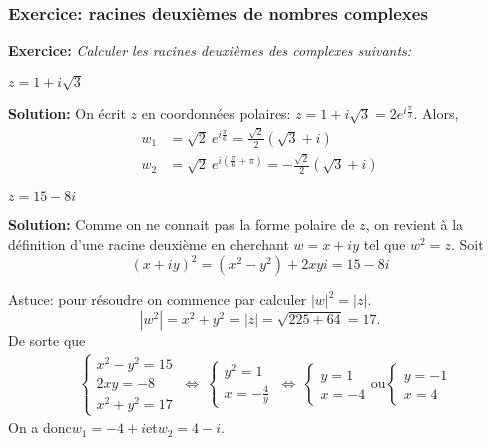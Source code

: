 

\begin{frame}%
\frametitle{\bf Exercice: racines deuxièmes de nombres complexes} 
\medskip 

{\bf Exercice:}
{\it Calculer les racines deuxièmes des complexes suivants:} 
\vspace*{2mm}

\begin{itemize}
\bitem 
$z=1+i\sqrt{3}$ 
\end{itemize}

\pause
{\bf Solution:} 
On \'ecrit $z$ en coordonnées polaires: $z=1+i\sqrt{3}=2 e^{i\frac{\pi}{3}}$. 
Alors,
\begin{align*}
w_1 & =\sqrt{2}\ e^{i\frac{\pi}{6}}=\frac{\sqrt{2}}{2}(\sqrt{3}+i) \\
w_2 & =\sqrt{2}\ e^{i\left(\frac{\pi}{6}+\pi\right)}
=-\frac{\sqrt{2}}{2}(\sqrt{3}+i)
\end{align*} 

\pause
\begin{itemize}
\bitem 
$z=15-8i$
\end{itemize}

\pause
{\bf Solution:} 
Comme on ne connait pas la forme polaire de $z$, on revient à la définition d'une racine deuxième en cherchant 
$w=x+iy$ tel que $w^2=z$. Soit
$$(x+iy)^2=(x^2-y^2)+2xyi =15-8i$$ 

 Astuce: pour résoudre on commence par calculer $\vert w\vert^2=\vert z\vert$.
$$\left|w^2\right|=x^2+y^2=\left|z\right|=\sqrt{225+64}=17.$$
De sorte que
\begin{align*}
& \left\{\begin{array}{l} 
x^2-y^2 = 15 \\ 2xy = -8 \\ x^2+y^2 = 17 
\end{array}\right. 
\ \Leftrightarrow\
\left\{\begin{array}{l} 
y^2 = 1 \\ x = -\frac{4}{y} 
\end{array}\right. 
\ \Leftrightarrow\ 
\left\{\begin{array}{l} 
y = 1 \\ x = -4
\end{array}\right. 
\mbox{ou}
\left\{\begin{array}{l} 
y = -1 \\ x = 4
\end{array}\right. 
\end{align*}
On a donc\quad $w_1=-4+i$\quad et\quad $w_2=4-i$. 

\end{frame}


